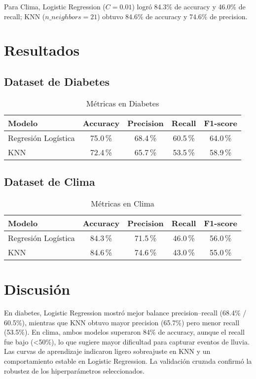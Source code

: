 \documentclass[journal]{IEEEtran}
\begin{document}
\noindent
Para Clima, Logistic Regression (\(C=0.01\)) logró 84.3\% de accuracy y 46.0\% de recall; KNN (\(n\_neighbors=21\)) obtuvo 84.6\% de accuracy y 74.6\% de precision.

\section{Resultados}

\subsection{Dataset de Diabetes}
\begin{table}[!htbp]
  \centering
  \caption{Métricas en Diabetes}
  \label{tab:diabetes_results}
  \begin{tabular}{lcccc}
    \toprule
    Modelo              & Accuracy & Precision & Recall & F1-score \\
    \midrule
    Regresión Logística & 75.0\,\% & 68.4\,\%  & 60.5\,\% & 64.0\,\% \\
    KNN                  & 72.4\,\% & 65.7\,\%  & 53.5\,\% & 58.9\,\% \\
    \bottomrule
  \end{tabular}
\end{table}

\subsection{Dataset de Clima}
\begin{table}[!htbp]
  \centering
  \caption{Métricas en Clima}
  \label{tab:weather_results}
  \begin{tabular}{lcccc}
    \toprule
    Modelo              & Accuracy & Precision & Recall & F1-score \\
    \midrule
    Regresión Logística & 84.3\,\% & 71.5\,\%  & 46.0\,\% & 56.0\,\% \\
    KNN                  & 84.6\,\% & 74.6\,\%  & 43.0\,\% & 55.0\,\% \\
    \bottomrule
  \end{tabular}
\end{table}

\section{Discusión}
En diabetes, Logistic Regression mostró mejor balance precision–recall (68.4\% / 60.5\%), mientras que KNN obtuvo mayor precision (65.7\%) pero menor recall (53.5\%). En clima, ambos modelos superaron 84\% de accuracy, aunque el recall fue bajo (<50\%), lo que sugiere mayor dificultad para capturar eventos de lluvia. Las curvas de aprendizaje indicaron ligero sobreajuste en KNN y un comportamiento estable en Logistic Regression. La validación cruzada confirmó la robustez de los hiperparámetros seleccionados.
\end{document}
